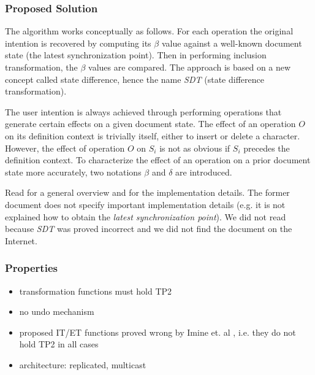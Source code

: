 \subsubsection{Proposed Solution}
The algorithm works conceptually as follows. For each operation the original intention is recovered by computing its $\beta$ value against a well-known document state (the latest synchronization point). Then in performing inclusion transformation, the $\beta$ values are compared. The approach is based on a new concept called state difference, hence the name \emph{SDT} (state difference transformation).

The user intention is always achieved through performing operations that generate certain effects on a given document state. The effect of an operation $O$ on its definition context is trivially itself, either to insert or delete a character. However, the effect of operation $O$ on $S_{i}$ is not as obvious if $S_{i}$ precedes the definition context. To characterize the effect of an operation on a prior document state more accurately, two notations $\beta$ and $\delta$ are introduced.

Read \cite{sdt} for a general overview and \cite{li03} for the implementation details. The former document does not specify important implementation details (e.g. it is not explained how to obtain the \emph{latest synchronization point}). We did not read \cite{li03} because \emph{SDT} was proved incorrect \cite{imine04} and we did not find the document on the Internet.

\subsubsection{Properties}
\begin{itemize}
 \item transformation functions must hold TP2
 \item no undo mechanism
 \item proposed IT/ET functions proved wrong by Imine et. al \cite{imine04}, 
       i.e. they do not hold TP2 in all cases
 \item architecture: replicated, multicast
\end{itemize}



